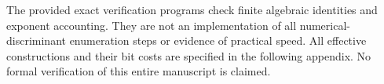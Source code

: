 The provided exact verification programs check finite algebraic
identities and exponent accounting.  They are not an implementation of
all numerical-discriminant enumeration steps or evidence of practical
speed.  All effective constructions and their bit costs are specified
in the following appendix.  No formal verification of this entire
manuscript is claimed.

\appendix

